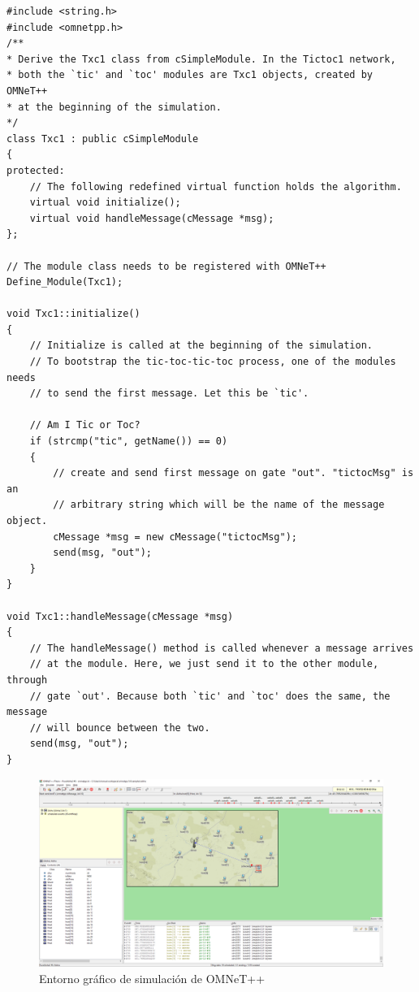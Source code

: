 \documentclass[11pt,letterpaper]{article}
\begin{document}
\noindent\begin{minipage}{\linewidth}
	\begin{lstlisting}[style=CPP, label={lst:txc1_cc}, caption={Lógica del módulo \emph{Txc1}.}]
#include <string.h>
#include <omnetpp.h>
/**
* Derive the Txc1 class from cSimpleModule. In the Tictoc1 network,
* both the `tic' and `toc' modules are Txc1 objects, created by OMNeT++
* at the beginning of the simulation.
*/
class Txc1 : public cSimpleModule
{
protected:
	// The following redefined virtual function holds the algorithm.
	virtual void initialize();
	virtual void handleMessage(cMessage *msg);
};

// The module class needs to be registered with OMNeT++
Define_Module(Txc1);

void Txc1::initialize()
{
	// Initialize is called at the beginning of the simulation.
	// To bootstrap the tic-toc-tic-toc process, one of the modules needs
	// to send the first message. Let this be `tic'.

	// Am I Tic or Toc?
	if (strcmp("tic", getName()) == 0)
	{
	    // create and send first message on gate "out". "tictocMsg" is an
	    // arbitrary string which will be the name of the message object.
	    cMessage *msg = new cMessage("tictocMsg");
	    send(msg, "out");
	}
}

void Txc1::handleMessage(cMessage *msg)
{
	// The handleMessage() method is called whenever a message arrives
	// at the module. Here, we just send it to the other module, through
	// gate `out'. Because both `tic' and `toc' does the same, the message
	// will bounce between the two.
	send(msg, "out");
}
	\end{lstlisting}
\end{minipage}


\begin{figure}[ht]
  \centering
  \includegraphics[width=\linewidth]{aloha.png}
  \caption{Entorno gráfico de simulación de OMNeT++}
  \label{fig:omnetgui}
\end{figure}
\end{document}
